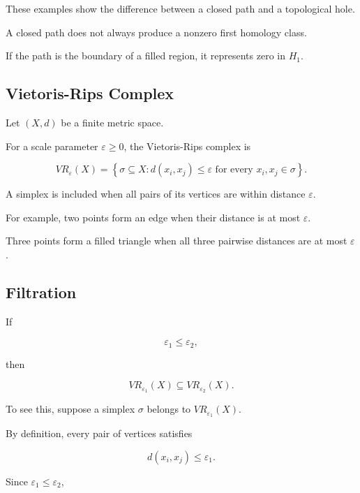 \documentclass[oneside,english,11pt]{article}
\renewcommand{\boxed}[1]{#1}
\begin{document}
\noindent
These examples show the difference between
a closed path and a topological hole.

A closed path does not always produce a
nonzero first homology class.

If the path is the boundary of a filled
region, it represents zero in $H_1$.

\subsection{Vietoris-Rips Complex}

Let $(X,d)$ be a finite metric space.

For a scale parameter $\varepsilon\geq0$,
the Vietoris-Rips complex is

\begin{equation}
\boxed{
VR_{\varepsilon}(X)
=
\left\{
\sigma\subseteq X:
d(x_i,x_j)\leq\varepsilon
\text{ for every }x_i,x_j\in\sigma
\right\}.
}
\end{equation}

A simplex is included when all pairs of its vertices
are within distance $\varepsilon$.

For example, two points form an edge when their
distance is at most $\varepsilon$.

Three points form a filled triangle when all
three pairwise distances are at most $\varepsilon$.

\subsection{Filtration}

If

\begin{equation}
\varepsilon_1\leq\varepsilon_2,
\end{equation}

then

\begin{equation}
\boxed{
VR_{\varepsilon_1}(X)
\subseteq
VR_{\varepsilon_2}(X).
}
\end{equation}

To see this, suppose a simplex $\sigma$ belongs to
$VR_{\varepsilon_1}(X)$.

By definition, every pair of vertices satisfies

\begin{equation}
d(x_i,x_j)\leq\varepsilon_1.
\end{equation}

Since $\varepsilon_1\leq\varepsilon_2$,
\end{document}
